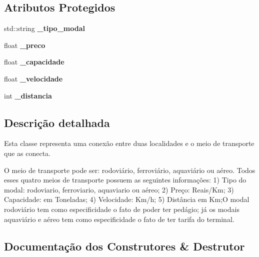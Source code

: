 \subsection*{Atributos Protegidos}
\begin{DoxyCompactItemize}
\item 
\mbox{\label{classModal_aef40834202f0fe655d4c1d3478a41d0f}} 
std\+::string {\bfseries \+\_\+tipo\+\_\+modal}
\item 
\mbox{\label{classModal_a487c4263e492750fbaac789e0e3feef3}} 
float {\bfseries \+\_\+preco}
\item 
\mbox{\label{classModal_a61a2da94d2f76fc7f761928d78d51196}} 
float {\bfseries \+\_\+capacidade}
\item 
\mbox{\label{classModal_adebafa0b04fbf2c065bb6ebcf84f1524}} 
float {\bfseries \+\_\+velocidade}
\item 
\mbox{\label{classModal_a39f95d6378c8794c91bca2efbbf11337}} 
int {\bfseries \+\_\+distancia}
\end{DoxyCompactItemize}


\subsection{Descrição detalhada}
Esta classe representa uma conexão entre duas localidades e o meio de transporte que as conecta. 

O meio de transporte pode ser\+: rodoviário, ferroviário, aquaviário ou aéreo. Todos esses quatro meios de transporte possuem as seguintes informações\+: 1) Tipo do modal\+: rodoviario, ferroviario, aquaviario ou aéreo; 2) Preço\+: Reais/\+Km; 3) Capacidade\+: em Toneladas; 4) Velocidade\+: Km/h; 5) Distância em Km;O modal rodoviário tem como especificidade o fato de poder ter pedágio; já os modais aquaviário e aéreo tem como especificidade o fato de ter tarifa do terminal. 

\subsection{Documentação dos Construtores \& Destrutor}
\mbox{\label{classModal_a8762a8d9f09cb6a2ec5f54f5d26412c0}} 
